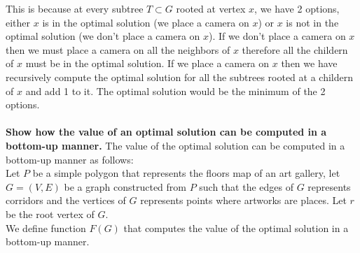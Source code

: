 \documentclass[addpoints,a4paper]{exam}
\begin{document}
\begin{questions}
\begin{solution}
\begin{parts}
			This is because at every subtree $T \subset G$ rooted at vertex $x$, we have 2 options, either $x$ is in the optimal solution (we place a camera on $x$) or $x$ is not in the optimal solution (we don't place a camera on $x$). 
			If we don't place a camera on $x$ then we must place a camera on all the neighbors of $x$ therefore all the childern of $x$ must be in the optimal solution.
			If we place a camera on $x$ then we have recursively compute the optimal solution for all the subtrees rooted at a childern of $x$ and add 1 to it. The optimal solution would be the minimum of the 2 options.
			\\\\\textbf{Show how the value of an optimal solution can be computed in a bottom-up manner.}
			The value of the optimal solution can be computed in a bottom-up manner as follows:
			\\Let $P$ be a simple polygon that represents the floors map of an art gallery, let $G = (V,E)$ be a graph constructed from $P$ such that the edges of $G$ represents corridors and the vertices of $G$ represents points where artworks are places. 
			Let $r$ be the root vertex of $G$.
			\\We define function $F(G)$ that computes the value of the optimal solution in a bottom-up manner.
			

\end{parts}
\end{solution}
\end{questions}
\end{document}
